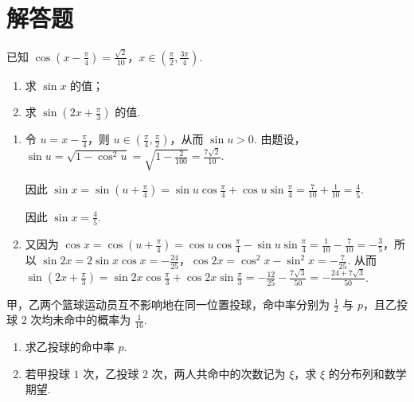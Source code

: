 \section{解答题}

\begin{problem}
已知 \(\cos \left(x - \frac{\pi}{4}\right) = \frac{\sqrt{2}}{10}\)，\(x \in \left(\frac{\pi}{2}, \frac{3\pi}{4}\right)\).
\begin{enumerate}
\item 求 \(\sin x\) 的值；
\item 求 \( \sin\left(2x+\frac{\pi}{3}\right) \) 的值.
\end{enumerate}
\end{problem}

\begin{solution}
\begin{enumerate}
\item
令 \(u=x-\frac{\pi}{4}\)，则 \(u\in\left(\frac{\pi}{4},\frac{\pi}{2}\right)\)，从而 \(\sin u>0\). 由题设，
\(\sin u=\sqrt{1-\cos^2u}=\sqrt{1-\frac{2}{100}}=\frac{7\sqrt{2}}{10}\).

因此 \(\sin x=\sin\left(u+\frac{\pi}{4}\right)=\sin u\cos\frac{\pi}{4}+\cos u\sin\frac{\pi}{4}=\frac{7}{10}+\frac{1}{10}=\frac45\).

因此 \(\sin x=\frac45\).

\item
又因为 \(\cos x=\cos\left(u+\frac{\pi}{4}\right)=\cos u\cos\frac{\pi}{4}-\sin u\sin\frac{\pi}{4}=\frac{1}{10}-\frac{7}{10}=-\frac35\)，所以 \(\sin 2x=2\sin x\cos x=-\frac{24}{25}\)，\(\cos 2x=\cos^2x-\sin^2x=-\frac{7}{25}\). 从而 \(\sin\left(2x+\frac{\pi}{3}\right)=\sin 2x\cos\frac{\pi}{3}+\cos 2x\sin\frac{\pi}{3}=-\frac{12}{25}-\frac{7\sqrt{3}}{50}=-\frac{24+7\sqrt{3}}{50}\).
\end{enumerate}
\end{solution}

\begin{problem}
甲，乙两个篮球运动员互不影响地在同一位置投球，命中率分别为 \(\frac{1}{2}\) 与 \(p\)，且乙投球 \(2\) 次均未命中的概率为 \(\frac{1}{16}\).
\begin{enumerate}
\item 求乙投球的命中率 \(p\).
\item 若甲投球 \(1\) 次，乙投球 \(2\) 次，两人共命中的次数记为 \(\xi\)，求 \(\xi\) 的分布列和数学期望.
\end{enumerate}
\end{problem}

